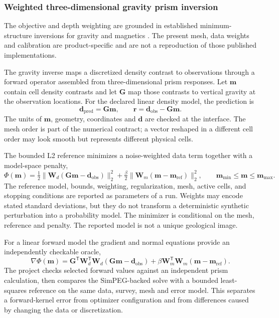 \subsubsection{Weighted three-dimensional gravity prism inversion}

The objective and depth weighting are grounded in established minimum-structure inversions for gravity and magnetics \cite{liGrav1998,liMag1996}. The present mesh, data weights and calibration are product-specific and are not a reproduction of those published implementations.
\label{method-gravity-inversion}

The gravity inverse maps a discretized density contrast to observations
through a forward operator assembled from three-dimensional prism
responses. Let $\mathbf{m}$ contain cell density contrasts and let
$\mathbf{G}$ map those contrasts to vertical gravity at the observation
locations. For the declared linear density model, the prediction is
\begin{equation}
  \mathbf{d}_{\mathrm{pred}} = \mathbf{G}\mathbf{m},
  \qquad
  \mathbf{r}=\mathbf{d}_{\mathrm{obs}}-\mathbf{G}\mathbf{m}.
  \label{eq:gravity-prism-forward}
\end{equation}
The units of $\mathbf{m}$, geometry, coordinates and $\mathbf{d}$ are
checked at the interface. The mesh order is part of the numerical
contract; a vector reshaped in a different cell order may look smooth
but represents different physical cells.

The bounded L2 reference minimizes a noise-weighted data term together
with a model-space penalty,
\begin{equation}
  \Phi(\mathbf{m}) = \tfrac12\|\mathbf{W}_d(\mathbf{G}\mathbf{m}-\mathbf{d}_{\mathrm{obs}})\|_2^2
  + \tfrac{\beta}{2}\|\mathbf{W}_m(\mathbf{m}-\mathbf{m}_{\mathrm{ref}})\|_2^2,
  \qquad \mathbf{m}_{\min}\leq\mathbf{m}\leq\mathbf{m}_{\max}.
  \label{eq:gravity-l2-objective}
\end{equation}
The reference model, bounds, weighting, regularization, mesh, active
cells, and stopping conditions are reported as parameters of a run.
Weights may encode stated standard deviations, but they do not
transform a deterministic synthetic perturbation into a probability
model. The minimizer is conditional on the mesh, reference and penalty.
The reported model is not a unique geological image.

For a linear forward model the gradient and normal equations provide
an independently checkable oracle,
\begin{equation}
  \nabla\Phi(\mathbf{m}) = \mathbf{G}^{\mathsf T}\mathbf{W}_d^{\mathsf T}\mathbf{W}_d
  (\mathbf{G}\mathbf{m}-\mathbf{d}_{\mathrm{obs}})
  +\beta\mathbf{W}_m^{\mathsf T}\mathbf{W}_m(\mathbf{m}-\mathbf{m}_{\mathrm{ref}}).
  \label{eq:gravity-gradient}
\end{equation}
The project checks selected forward values against an independent prism
calculation, then compares the SimPEG-backed solve with a bounded
least-squares reference on the same data, survey, mesh and error model.
This separates a forward-kernel error from optimizer configuration
and from differences caused by changing the data or discretization.

